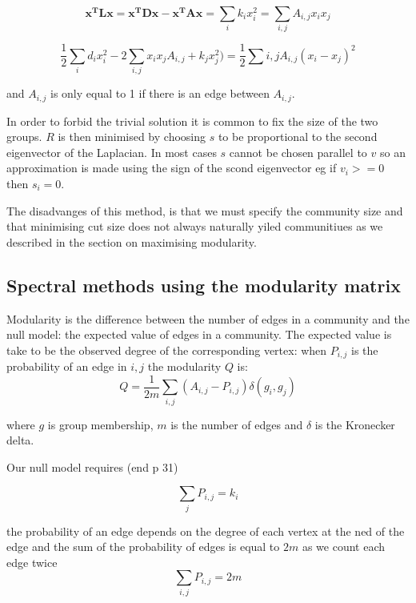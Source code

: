 \begin{equation}
\mathbf{x^T}\mathbf{L}\mathbf{x}=\mathbf{x^T}\mathbf{D}\mathbf{x}-\mathbf{x^T}\mathbf{A}\mathbf{x}=\sum_i k_i x_i^2 = \sum_{i,j} A_{i,j}x_i x_j
\end{equation}

\begin{equation}
\frac{1}{2}\sum_i d_i x_i^2 - 2 \sum_{i,j} x_i x_j A_{i,j} + k_jx_j^2)=\frac{1}{2}\sum{i,j}A_{i,j}(x_i - x_j)^2
\end{equation}

and $A_{i,j}$ is only equal to 1 if there is an edge between $A_{i,j}$.

In order to forbid the trivial solution it is common to fix the size of the two groups. $R$ is then minimised by choosing $s$ to be proportional to the second eigenvector of the Laplacian. In most cases $s$ cannot be chosen parallel to $v$ so an approximation is made using the sign of the scond eigenvector eg if $v_i>=0$ then $s_i=0$.

The disadvanges of this method, is that we must specify the community size and that minimising cut size does not always naturally yiled communitiues as we described in the section on maximising modularity.

\subsection{Spectral methods using the modularity matrix}

Modularity is the difference between the number of edges in a community and the null model: the expected value of edges in a community. The expected value is take to be the observed degree of the corresponding vertex: when $P_{i,j}$ is the probability of an edge in $i,j$ the modularity $Q$ is:
\begin{equation}
Q = \frac{1}{2m} \sum_{i,j} (A_{i,j}-P_{i,j})\delta(g_i,g_j)
\end{equation}

where $g$ is group membership, $m$ is the number of edges and $\delta$ is the Kronecker delta.

Our null model requires (end p 31)

\begin{equation}
\sum_j P_{i,j}=k_i	
\end{equation}

the probability of an edge depends on the degree of each vertex at the ned of the edge and the sum of the probability of edges is equal to $2m$ as we count each edge twice
\begin{equation}
	\sum_{i,j} P_{i,j}=2m
\end{equation}


